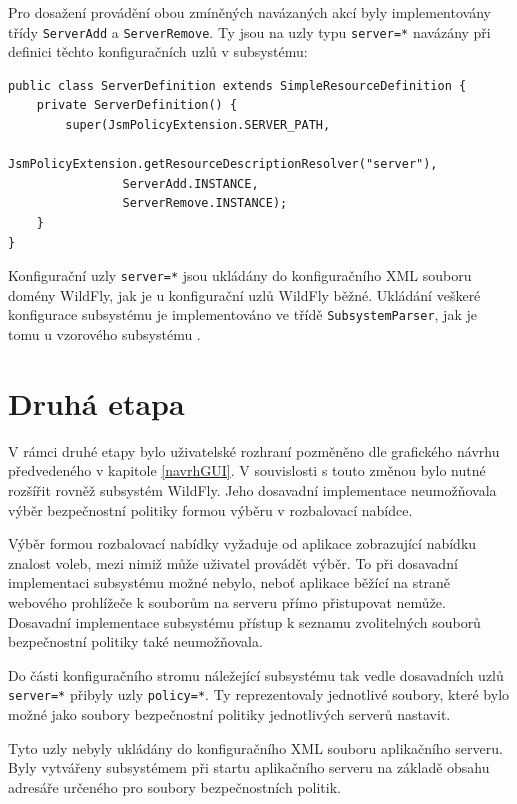 Pro dosažení provádění obou zmíněných navázaných akcí byly implementovány třídy {\tt ServerAdd} a {\tt ServerRemove}.
Ty jsou na uzly typu {\tt server=*} navázány při definici těchto konfiguračních uzlů v subsystému:

\begin{lstlisting}[caption=Definice konfiguračního uzlu {\tt server=*}, label=registraceUzluServer]
public class ServerDefinition extends SimpleResourceDefinition {
    private ServerDefinition() {
        super(JsmPolicyExtension.SERVER_PATH,
                JsmPolicyExtension.getResourceDescriptionResolver("server"),
                ServerAdd.INSTANCE,
                ServerRemove.INSTANCE);
    }
}
\end{lstlisting}

Konfigurační uzly {\tt server=*} jsou ukládány do konfiguračního XML souboru domény WildFly, jak je u konfigurační uzlů WildFly běžné.
Ukládání veškeré konfigurace subsystému je implementováno ve třídě {\tt SubsystemParser}, jak je tomu u vzorového subsystému \cite{WildFlyExtending}.

\section{Druhá etapa}

V rámci druhé etapy bylo uživatelské rozhraní pozměněno dle grafického návrhu předvedeného v kapitole \ref{navrhGUI}. V souvislosti s touto změnou bylo nutné rozšířit rovněž subsystém WildFly. Jeho dosavadní implementace neumožňovala výběr bezpečnostní politiky formou výběru v rozbalovací nabídce.

Výběr formou rozbalovací nabídky vyžaduje od aplikace zobrazující nabídku znalost voleb, mezi nimiž může uživatel provádět výběr.
To při dosavadní implementaci subsystému možné nebylo, neboť aplikace běžící na straně webového prohlížeče k souborům na serveru přímo přistupovat nemůže.
Dosavadní implementace subsystému přístup k seznamu zvolitelných souborů bezpečnostní politiky také neumožňovala.

Do části konfiguračního stromu náležející subsystému tak vedle dosavadních uzlů {\tt server=*} přibyly uzly {\tt policy=*}.
Ty reprezentovaly jednotlivé soubory, které bylo možné jako soubory bezpečnostní politiky jednotlivých serverů nastavit.

Tyto uzly nebyly ukládány do konfiguračního XML souboru aplikačního serveru.
Byly vytvářeny subsystémem při startu aplikačního serveru na základě obsahu adresáře určeného pro soubory bezpečnostních politik.

